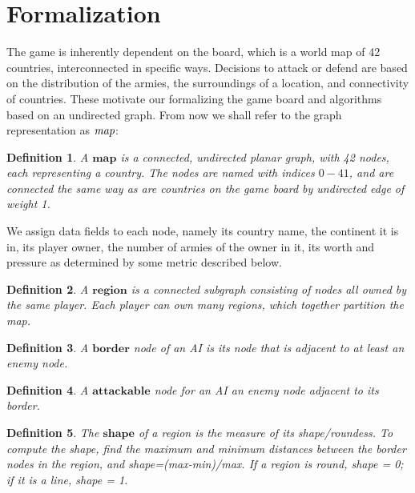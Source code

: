 \documentclass[12pt]{article}  %
\newtheorem{definition}{Definition}
\begin{document}
\section{Formalization} \label{formalization}

The game is inherently dependent on the board, which is a world map of 42 countries, interconnected in specific ways. Decisions to attack or defend are based on the distribution of the armies, the surroundings of a location, and connectivity of countries. These motivate our formalizing the game board and algorithms based on an undirected graph. From now we shall refer to the graph representation as $\emph{map}$:

\begin{definition} \label{map}
A $\textbf{map}$ is a connected, undirected planar graph, with 42 nodes, each representing a country. The nodes are named with indices $0-41$, and are connected the same way as are countries on the game board by undirected edge of weight 1.
\end{definition}

We assign data fields to each node, namely its country name, the continent it is in, its player owner, the number of armies of the owner in it, its worth and pressure as determined by some metric described below.


\begin{definition} \label{region}
A $\textbf{region}$ is a connected subgraph consisting of nodes all owned by the same player. Each player can own many regions, which together partition the map.
\end{definition}

\begin{definition} \label{border}
A $\textbf{border}$ node of an AI is its node that is adjacent to at least an enemy node.
\end{definition}

\begin{definition} \label{attackable}
A $\textbf{attackable}$ node for an AI an enemy node adjacent to its border.
\end{definition}

\begin{definition} \label{shape}
The $\textbf{shape}$ of a region is the measure of its shape/roundess. To compute the shape, find the maximum and minimum distances between the border nodes in the region, and shape=(max-min)/max. If a region is round, shape = 0; if it is a line, shape = 1.
\end{definition}
\end{document}
